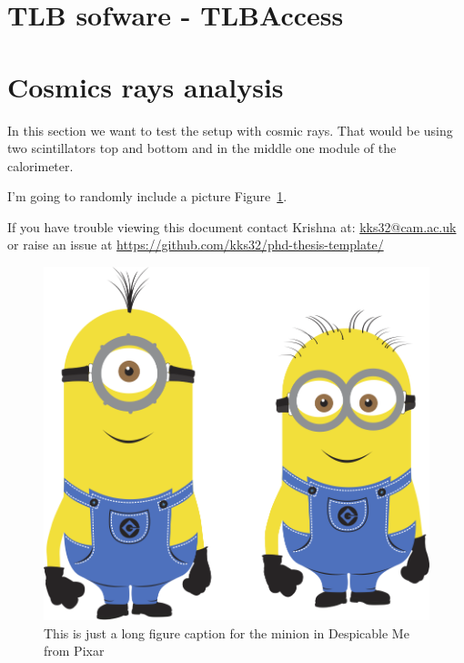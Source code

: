 \section{TLB sofware - TLBAccess}
\section[Cosmic rays test]{Cosmics rays analysis}

In this section we want to test the setup with cosmic rays. That would be using two scintillators top and bottom and in the middle one module of the calorimeter.


I'm going to randomly include a picture Figure~\ref{fig:minion}.


If you have trouble viewing this document contact Krishna at: \href{mailto:kks32@cam.ac.uk}{kks32@cam.ac.uk} or raise an issue at \url{https://github.com/kks32/phd-thesis-template/}


\begin{figure}[htbp!] 
\centering    
\includegraphics[width=1.0\textwidth]{minion}
\caption[Minion]{This is just a long figure caption for the minion in Despicable Me from Pixar}
\label{fig:minion}
\end{figure}


